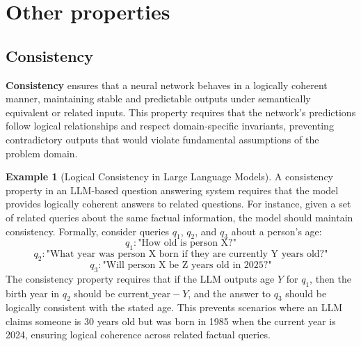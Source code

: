 \documentclass[oneside,11pt,dvipsnames]{book}
\numberwithin{equation}{section}
\theoremstyle{definition}
\newtheorem{example}{Example}[section]
\theoremstyle{remark}
\begin{document}
\section{Other properties}\label{sec:other-properties}

\subsection{Consistency}

\textbf{Consistency} ensures that a neural network behaves in a logically coherent manner, maintaining stable and predictable outputs under semantically equivalent or related inputs. This property requires that the network's predictions follow logical relationships and respect domain-specific invariants, preventing contradictory outputs that would violate fundamental assumptions of the problem domain. 

\begin{example}[Logical Consistency in Large Language Models]
    A consistency property in an LLM-based question answering system requires that the model provides logically coherent answers to related questions. For instance, given a set of related queries about the same factual information, the model should maintain consistency. Formally, consider queries $q_1$, $q_2$, and $q_3$ about a person's age:
\[
q_1: \text{"How old is person X?"}
\]
\[
q_2: \text{"What year was person X born if they are currently Y years old?"}
\]
\[
q_3: \text{"Will person X be Z years old in 2025?"}
\]
The consistency property requires that if the LLM outputs age $Y$ for $q_1$, then the birth year in $q_2$ should be $\text{current\_year} - Y$, and the answer to $q_3$ should be logically consistent with the stated age. This prevents scenarios where an LLM claims someone is 30 years old but was born in 1985 when the current year is 2024, ensuring logical coherence across related factual queries.
\end{example}



\end{document}
